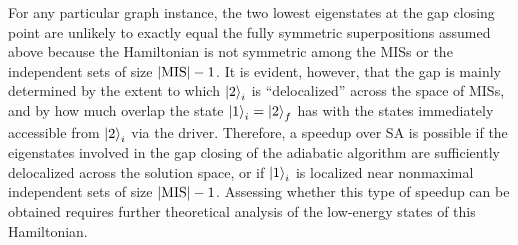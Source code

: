 \documentclass[twocolumn,amssymb,secnumarabic, prl, aps, nofootinbib]{revtex4-1}
\newcommand{\MIS}{\textnormal{MIS}}
\begin{document}
For any particular graph instance, the two lowest eigenstates at the gap closing point are unlikely to exactly equal the fully symmetric superpositions assumed above because the Hamiltonian is not symmetric among the MISs or the independent sets of size $|\MIS|-1$.
It is evident, however,
that the gap
is mainly determined by the extent to which 
$\ket{2}_i$ is ``delocalized'' across the space of MISs, and by how much overlap the state $\ket{1}_i=\ket{2}_f$ has with the states immediately accessible from $\ket{2}_i$ via the driver. Therefore, a speedup over SA is possible if the eigenstates involved in the gap closing of the adiabatic algorithm are sufficiently delocalized across the solution space, or if $\ket{1}_i$ is localized near nonmaximal independent sets of size $|\MIS|-1$.
Assessing whether this type of speedup can be obtained requires further theoretical analysis of the low-energy states of this Hamiltonian.



%
%
	

	
	
\end{document}

